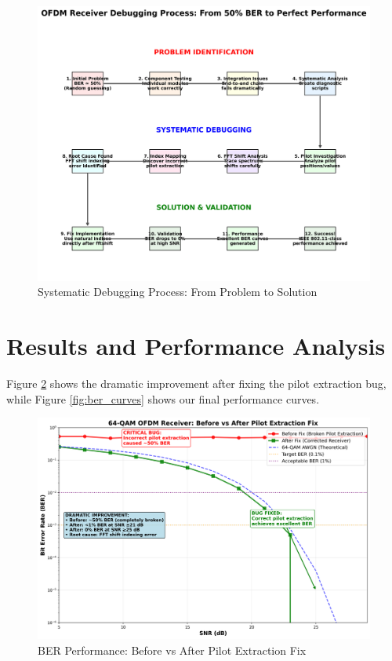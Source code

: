 \documentclass[11pt,a4paper]{article}
\begin{document}
\begin{figure}[H]
    \centering
    \includegraphics[width=\textwidth]{debugging_process_diagram.png}
    \caption{Systematic Debugging Process: From Problem to Solution}
    \label{fig:debugging_process}
\end{figure}

\section{Results and Performance Analysis}

Figure \ref{fig:ber_comparison} shows the dramatic improvement after fixing the pilot extraction bug, while Figure \ref{fig:ber_curves} shows our final performance curves.

\begin{figure}[H]
    \centering
    \includegraphics[width=\textwidth]{ber_before_after_comparison.png}
    \caption{BER Performance: Before vs After Pilot Extraction Fix}
    \label{fig:ber_comparison}
\end{figure}
\end{document}
